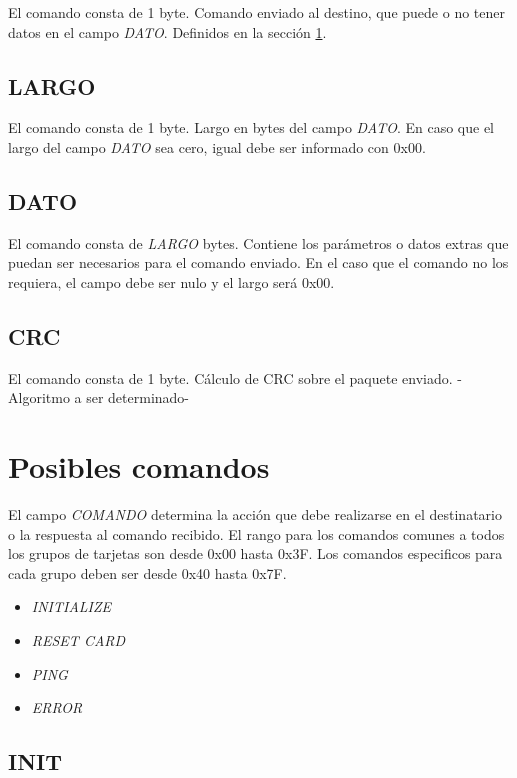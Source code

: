 \documentclass[a4paper,11pt]{article}
\begin{document}
	El comando consta de 1 byte.
	Comando enviado al destino, que puede o no tener datos en el campo \emph{DATO}.
	Definidos en la secci\'on \ref{comandos}.

\subsection{LARGO}
\label{largo}

	El comando consta de 1 byte.
	Largo en bytes del campo \emph{DATO}.
	En caso que el largo del campo \emph{DATO} sea cero, igual debe ser informado con 0x00.

\subsection{DATO}
\label{dato}

	El comando consta de \emph{LARGO} bytes.
	Contiene los par\'ametros o datos extras que puedan ser necesarios para el comando enviado.
	En el caso que el comando no los requiera, el campo debe ser nulo y el largo ser\'a 0x00.

\subsection{CRC}
\label{crc}

	El comando consta de 1 byte.
	C\'alculo de CRC sobre el paquete enviado.
	-Algoritmo a ser determinado-

\section{Posibles comandos}
\label{comandos}

El campo \emph{COMANDO} determina la acci\'on que debe realizarse en el destinatario o la respuesta al comando recibido.
El rango para los comandos comunes a todos los grupos de tarjetas son desde 0x00 hasta 0x3F.
Los comandos especificos para cada grupo deben ser desde 0x40 hasta 0x7F.

\begin{itemize}
	\item \emph{INITIALIZE}
	\item \emph{RESET CARD}
	\item \emph{PING}
	\item \emph{ERROR}
\label{lista_comandos}
\end{itemize}

\subsection{INIT}
\label{init}
\end{document}
